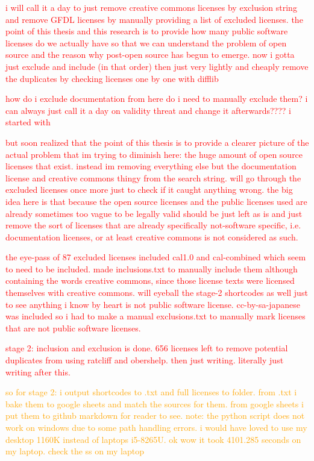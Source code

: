 \textcolor{red}{i will call it a day to just remove creative commons licenses by exclusion string and remove GFDL licenses by manually providing a list of excluded licenses. the point of this thesis and this research is to provide how many public software licenses do we actually have so that we can understand the problem of open source and the reason why post-open source has begun to emerge. now i gotta just exclude and include (in that order) then just very lightly and cheaply remove the duplicates by checking licenses one by one with difflib}

\textcolor{red}{how do i exclude documentation from here do i need to manually exclude them? i can always just call it a day on validity threat and change it afterwards???? i started with}

\textcolor{red}{but soon realized that the point of this thesis is to provide a clearer picture of the actual problem that im trying to diminish here: the huge amount of open source licenses that exist. instead im removing everything else but the documentation license and creative commons thingy from the search string. will go through the excluded licenses once more just to check if it caught anything wrong. the big idea here is that because the open source licenses and the public licenses used are already sometimes too vague to be legally valid should be just left as is and just remove the sort of licenses that are already specifically not-software specific, i.e. documentation licenses, or at least creative commons is not considered as such.}

\textcolor{red}{the eye-pass of 87 excluded licenses included cal1.0 and cal-combined which seem to need to be included. made inclusions.txt to manually include them although containing the words creative commons, since those license texts were licensed themselves with creative commons. will eyeball the stage-2 shortcodes as well just to see anything i know by heart is not public software license. cc-by-sa-japanese was included so i had to make a manual exclusions.txt to manually mark licenses that are not public software licenses.}

\textcolor{red}{stage 2: inclusion and exclusion is done. 656 licenses left to remove potential duplicates from using ratcliff and obershelp. then just writing. literally just writing after this.}

\textcolor{orange}{so for stage 2: i output shortcodes to .txt and full licenses to folder. from .txt i bake them to google sheets and match the sources for them. from google sheets i put them to github markdown for reader to see. note: the python script does not work on windows due to some path handling errors. i would have loved to use my desktop 1160K instead of laptops i5-8265U. ok wow it took 4101.285 seconds on my laptop. check the ss on my laptop}

